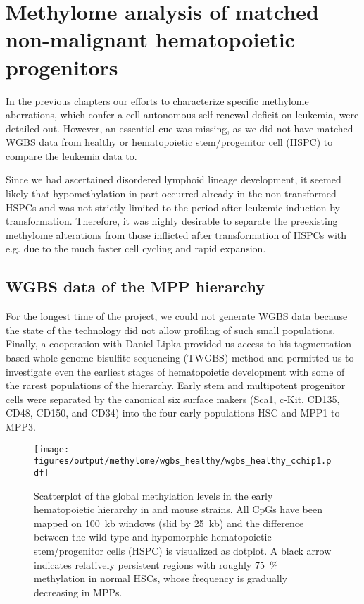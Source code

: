 \chapter{Methylome analysis of matched non-malignant hematopoietic progenitors}
\renewcommand{\arraystretch}{0.8}
\label{chap:r:wgbs_chip_hsc}
\minitoc
\renewcommand{\arraystretch}{1.4}

In the previous chapters our efforts to characterize specific methylome aberrations, which confer a cell-autonomous self-renewal deficit on \dnmtchip \kitpos leukemia, were detailed out. However, an essential cue was missing, as we did not have matched WGBS data from healthy \dnmtchip or \dnmtwt hematopoietic stem/progenitor cell (HSPC) to compare the leukemia data to.

Since we had ascertained disordered lymphoid lineage development\cite{Broeske2009}, it seemed likely that hypomethylation in part occurred already in the non-transformed HSPCs and was not strictly limited to the period after leukemic induction by \mllafnine transformation. Therefore, it was highly desirable to separate the preexisting \dnmtchip methylome alterations from those inflicted after transformation of HSPCs with \mllafninegfp e.g. due to the much faster cell cycling and rapid expansion. 


\section{WGBS data of the MPP hierarchy}
\label{chap:r:wgbs_chip_hsc:mpp}

For the longest time of the project, we could not generate WGBS data because the state of the technology did not allow profiling of such small populations. Finally, a cooperation with Daniel Lipka provided us access to his tagmentation-based whole genome bisulfite sequencing (TWGBS) method\cite{Lipka2014} and permitted us to investigate even the earliest stages of hematopoietic development with some of the rarest populations of the hierarchy. Early stem and multipotent progenitor cells were separated by the canonical six surface makers (Sca1, c-Kit, CD135, CD48, CD150, and CD34)\cite{Wilson2007} into the four early populations HSC and MPP1 to MPP3.

\begin{figure}[!ht] 
	\centering
	\texttt{[image: figures/output/methylome/wgbs\_healthy/wgbs\_healthy\_cchip1.pdf]} 
	\caption{Scatterplot of the global methylation levels in the early hematopoietic hierarchy in \dnmtwt and \dnmtchip mouse strains. All CpGs have been mapped on \SI{100}{\kilo b} windows (slid by \SI{25}{\kilo b}) and the difference between the wild-type and hypomorphic hematopoietic stem/progenitor cells (HSPC) is visualized as dotplot. A black arrow indicates relatively persistent regions with roughly \SI{75}{\percent} methylation in normal HSCs, whose frequency is gradually decreasing in MPPs.}
	\label{fig:wgbs_healthy_cchip1}
\end{figure}

